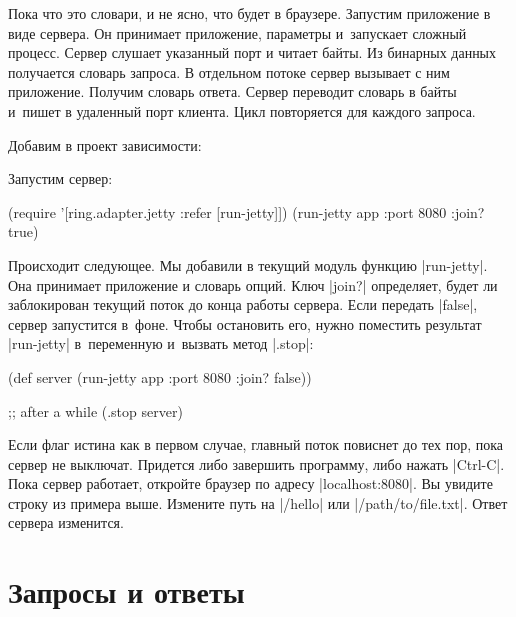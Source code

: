 Пока что это словари, и не ясно, что будет в браузере. Запустим приложение в
виде сервера. Он принимает приложение, параметры и~запускает сложный
процесс. Сервер слушает указанный порт и читает байты. Из бинарных данных
получается словарь запроса. В отдельном потоке сервер вызывает с ним
приложение. Получим словарь ответа. Сервер переводит словарь в байты и~пишет в
удаленный порт клиента. Цикл повторяется для каждого запроса.

Добавим в проект зависимости:

\begin{english}
  \begin{clojure}
  \end{clojure}
\end{english}

Запустим сервер:

\begin{english}
  \begin{clojure}
(require '[ring.adapter.jetty :refer [run-jetty]])
(run-jetty app {:port 8080 :join? true})
  \end{clojure}
\end{english}

Происходит следующее. Мы добавили в текущий модуль функцию
\spverb|run-jetty|. Она принимает приложение и словарь опций. Ключ
\spverb|join?| определяет, будет ли заблокирован текущий поток до конца работы
сервера. Если передать \spverb|false|, сервер запустится в~фоне. Чтобы
остановить его, нужно поместить результат \spverb|run-jetty| в~переменную
и~вызвать метод \spverb|.stop|:

\begin{english}
  \begin{clojure}
(def server
  (run-jetty app {:port 8080 :join? false}))

;; after a while
(.stop server)
  \end{clojure}
\end{english}

Если флаг истина как в первом случае, главный поток повиснет до тех пор, пока
сервер не выключат. Придется либо завершить программу, либо нажать
\spverb|Ctrl-C|. Пока сервер работает, откройте браузер по адресу
\spverb|localhost:8080|. Вы увидите строку из примера выше. Измените путь на
\spverb|/hello| или \spverb|/path/to/file.txt|. Ответ сервера изменится.

\section{Запросы и ответы}

